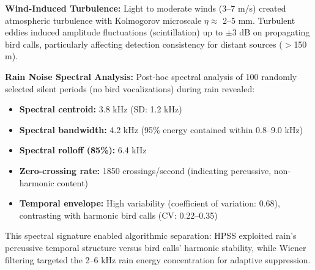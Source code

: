 \documentclass[twocolumn]{article}
\begin{document}
\textbf{Wind-Induced Turbulence:} Light to moderate winds (3--7 m/s) created atmospheric turbulence with Kolmogorov microscale $\eta \approx$ 2--5 mm. Turbulent eddies induced amplitude fluctuations (scintillation) up to $\pm$3 dB on propagating bird calls, particularly affecting detection consistency for distant sources ($>$150 m).

\textbf{Rain Noise Spectral Analysis:} Post-hoc spectral analysis of 100 randomly selected silent periods (no bird vocalizations) during rain revealed:

\begin{itemize}
\item \textbf{Spectral centroid:} 3.8 kHz (SD: 1.2 kHz)
\item \textbf{Spectral bandwidth:} 4.2 kHz (95\% energy contained within 0.8--9.0 kHz)
\item \textbf{Spectral rolloff (85\%):} 6.4 kHz
\item \textbf{Zero-crossing rate:} 1850 crossings/second (indicating percussive, non-harmonic content)
\item \textbf{Temporal envelope:} High variability (coefficient of variation: 0.68), contrasting with harmonic bird calls (CV: 0.22--0.35)
\end{itemize}

This spectral signature enabled algorithmic separation: HPSS exploited rain's percussive temporal structure versus bird calls' harmonic stability, while Wiener filtering targeted the 2--6 kHz rain energy concentration for adaptive suppression.
\end{document}
